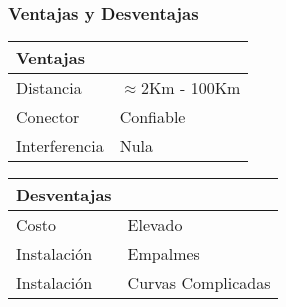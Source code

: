 \subsubsection{Ventajas y Desventajas}

\begin{center}
\begin{tabular}{*2l}
\toprule
Ventajas &   {} \\
\midrule
Distancia   & $\approx$2Km - 100Km   \\
Conector   &  Confiable \\
Interferencia   &  Nula \\
\bottomrule
\end{tabular}
\quad
\begin{tabular}{*2l}
\toprule
Desventajas &   {} \\
\midrule
Costo   & Elevado   \\
Instalación   &  Empalmes\\
Instalación   &  Curvas Complicadas\\
\bottomrule
\end{tabular}
\end{center}